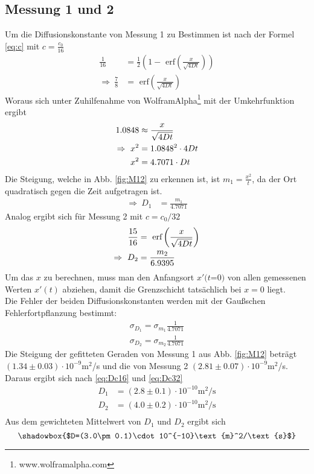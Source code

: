 \documentclass[12pt,a4paper,titlepage,headinclude,bibtotoc]{scrartcl}
\newcommand{\erf}[1]{\text{ erf}\ensuremath{\left( #1 \right)}}
\begin{document}
\subsection{Messung 1 und 2}
Um die Diffusionskonstante von Messung 1 zu Bestimmen ist nach der Formel \eqref{eq:c} mit $c=\frac{c_0}{16}$
\begin{align*}
 \frac{1}{16}&=\frac{1}{2}\left(1-\erf{\frac{x}{\sqrt{4Dt}}}\right)\\
 \Rightarrow~ \frac{7}{8}&=\erf{\frac{x}{\sqrt{4Dt}}}
\end{align*}Woraus sich unter Zuhilfenahme von WolframAlpha\textsuperscript{\textregistered}\footnote{www.wolframalpha.com} mit der Umkehrfunktion ergibt
\begin{align*}
 1.0848&\approx \frac{x}{\sqrt{4Dt}}\notag\\
 \Rightarrow~ x^2&=1.0848^2 \cdot 4Dt\notag\\
 x^2&=4.7071\cdot Dt\notag
\end{align*}
Die Steigung, welche in Abb. \ref{fig:M12} zu erkennen ist, ist $m_1=\frac{x^2}{t}$, da der Ort quadratisch gegen die Zeit aufgetragen ist.
\begin{align}
\Rightarrow ~D_1&=\frac{m_1}{4.7071}\label{eq:Dc16}
\end{align}
Analog ergibt sich für Messung 2 mit $c=c_0/32$
\begin{align}
 \frac{15}{16}&=\erf{\frac{x}{\sqrt{4Dt}}}\notag\\
 \Rightarrow~ D_2&=\frac{m_2}{6.9395}\label{eq:Dc32}
\end{align}
Um das $x$ zu berechnen, muss man den Anfangsort $x'(t$=$0)$ von allen gemessenen Werten $x'(t)$ abziehen, damit die Grenzschicht tatsächlich bei $x=0$ liegt.\\  
Die Fehler der beiden Diffusionskonstanten werden mit der Gaußschen Fehlerfortpflanzung bestimmt:
\begin{align*}
 \sigma_{D_1}= \sigma_{m_1}\frac{1}{4.7071}\\
 \sigma_{D_2}= \sigma_{m_2}\frac{1}{4.7071}
\end{align*}
Die Steigung der gefitteten Geraden von Messung 1 aus Abb. \ref{fig:M12} beträgt $(1.34\pm 0.03)\cdot 10^{-9}$m$^2$/s und die von Messung 2 $(2.81\pm 0.07)\cdot 10^{-9}$m$^2$/s.
Daraus ergibt sich nach \eqref{eq:Dc16} und \eqref{eq:Dc32}
\begin{align*}
 D_1&= (2.8\pm 0.1)\cdot 10^{-10}\text{m}^2/\text{s}\\
 D_2&= (4.0\pm 0.2)\cdot 10^{-10}\text{m}^2/\text{s}\\
\end{align*}
Aus dem gewichteten Mittelwert von $D_1$ und $D_2$ ergibt sich 
$$\shadowbox{$D=(3.0\pm 0.1)\cdot 10^{-10}\text{m}^2/\text{s}$}$$
\end{document}
